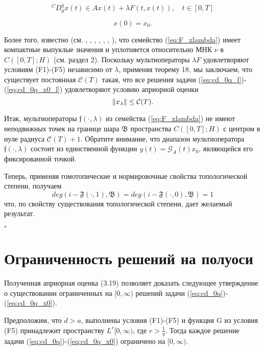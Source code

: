 \begin{equation}
    \label{eq:cd_0q_l}
    {}^CD_{0}^{q}x(t) \in Ax(t) + \lambda F(t, x(t)), \quad t \in [0, T]
\end{equation}

\begin{equation}
    \label{eq:cd_0q_x0_l}
    x(0) = x_0.
\end{equation}

Более того, известно (см. \cite{afanasova_rm}, \cite{benedetti}, \cite{kamenskii_fpt}, \cite{kamenskii_aa}, \cite{kamenskii_fpta17},
\cite{kamenskii_fpta19}, \cite{kamenskii_m}), что семейство (\ref{eq:F_xlambda}) имеет компактные выпуклые значения и уплотняется относительно
МНК $\nu$ в $C([0, T]; H)$ (см. раздел 2). Поскольку мультиоператоры $\lambda F$ удовлетворяют условиям (F1)-(F5) независимо от $\lambda$,
применяя теорему 18, мы заключаем, что существует постоянная $\mathcal{C}(T)$ такая, что все решения задачи
(\ref{eq:cd_0q_l})-(\ref{eq:cd_0q_x0_l}) удовлетворяют условию априорной оценки
$$\lVert x_{\lambda}\rVert \leq \mathcal{C}(T).$$

\noindent Итак, мультиоператоры $\mathfrak{f}(\cdot, \lambda)$ из семейства (\ref{eq:F_xlambda}) не имеют неподвижных точек на границе шара
$\mathfrak{B}$ пространства $C([0, T]; H)$ с центром в нуле радиуса $\mathcal{C}(T) + 1$. Обратите внимание, что диапазон мультиоператора
$\mathfrak{f}(\cdot, \lambda)$ состоит из единственной функции $y(t) = \mathcal{G}_A(t)x_0$, являющейся его фиксированной точкой.

Теперь, применяя гомотопические и нормировочные свойства топологической степени, получаем
$$deg(i - \mathfrak{F}(\cdot, 1), \mathfrak{B}) = deg(i - \mathfrak{F}(\cdot, 0), \mathfrak{B}) = 1$$
что, по свойству существования топологической степени, дает желаемый результат.

\begin{flushright}
    $\square$
\end{flushright}

\section{Ограниченность решений на полуоси}

Полученная априорная оценка (3.19) позволяет доказать следующее утверждение о существовании ограниченных на $[0, \infty)$ решений задачи
(\ref{eq:cd_0q})-(\ref{eq:cd_0q_x0}).

\begin{theorem}
    Предположим, что $d > a$, выполнены условия (F1)-(F5) и функция G из условия (F5) принадлежит пространству $L^r[0, \infty)$,
    где $r > \frac{1}{q}$. Тогда каждое решение задачи (\ref{eq:cd_0q})-(\ref{eq:cd_0q_x0}) ограничено на $[0, \infty)$.
\end{theorem}

